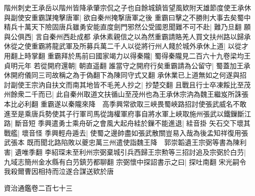 階州刺史王承岳以階州皆降承肇宗侃之子也自餘城鎮皆望風欵附天雄節度使王承休與副使安重霸謀掩擊唐軍|{
	欲自秦州掩撃唐軍之後}
重霸曰擊之不勝則大事去矣蜀中精兵十萬天下險固唐兵雖勇安能直度劍門邪然公受國恩聞難不可不赴|{
	難乃旦翻}
願與公俱西|{
	言自秦州西赴成都}
承休素親信之以為然重霸請賂羌人買文扶州路以歸承休從之使重霸將龍武軍及所募兵萬二千人以從將行州人餞於城外承休上道|{
	以從才用翻上時掌翻}
重霸拜於馬前曰國家竭力以得秦隴|{
	蜀得秦隴見二百六十九卷梁均王貞明元年}
若從開府還朝|{
	朝直遥翻}
誰當守之開府行矣重霸請為公留守|{
	蜀蓋加王承休開府儀同三司故稱之為于偽翻下為陳同守式又翻}
承休業已上道無如之何遂與招討副使王宗汭自扶文而南其地皆不毛羌人抄之|{
	抄楚交翻}
且戰且行士卒凍餒比至茂州餘衆二千而已|{
	此自秦州取道文扶循山至茂州也為王承休宗汭為魏王繼岌所誅張本比必利翻}
重霸遂以秦隴來降　高季興常欲取三峽畏蜀峽路招討使張武威名不敢進至是乘唐兵勢使其子行軍司馬從誨權軍府事自將水軍上峽取施州張武以鐵鏁斷江路|{
	斷音短}
季興遣勇士乘舟斫之會風大起舟絓於鏁不能進退|{
	絓音掛}
矢石交下壞其戰艦|{
	壞音怪}
季興輕舟遁去|{
	使蜀之邊帥盡如張武散關豈易入哉為後孟知祥復用張武張本}
既而聞北路陷敗以夔忠萬三州遣使詣魏王降　郭崇韜遺王宗弼等書為陳利害|{
	遺唯季翻}
李紹琛未至利州宗弼棄城引兵西歸王宗勲等三招討追及宗弼於白芀|{
	九域志簡州金水縣有白芀鎮芀都聊翻}
宗弼懷中探詔書示之曰|{
	探吐南翻}
宋光嗣令我殺爾曹因相持而泣遂合謀送欵於唐

資治通鑑卷二百七十三
